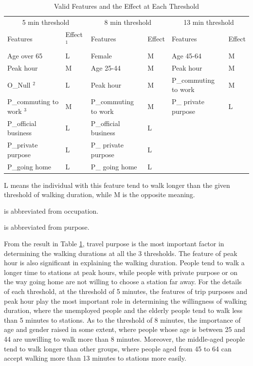 \documentclass[sustainability,article,submit,moreauthors,pdftex,10pt,a4paper]{Definitions/mdpi}
\begin{document}
%
\begin{table}[h]
	\caption{Valid Features and the Effect at Each Threshold}
	\label{table:ValidFeatures}
	\centering
	\begin{tabular}{llllll}
		\toprule
		\multicolumn{2}{c}{5 min threshold} & \multicolumn{2}{c}{8 min threshold} & \multicolumn{2}{c}{13 min threshold} \\
		Features & Effect $^1$ & Features & Effect & Features & Effect \\
		\midrule
		Age over 65 & L	& Female & M & Age 45-64 & M \\
		Peak hour & M & Age 25-44 & M & Peak hour & M \\
		O\_Null	$^2$ & L	& Peak hour	& M	& P\_commuting to work & M \\
		P\_commuting to work $^3$ & M	& P\_commuting to work  & M	& P\_ private purpose & L \\
		P\_official business & L & P\_official business	& L	& & \\
		P\_private purpose & L & P\_ private purpose	& L & & \\
		P\_going home & L & P\_ going home & L & &   \\
		\bottomrule
	\end{tabular}
	\normalsize
	\begin{description}
		\small
		\item[$^1$] L means the individual with this feature tend to walk longer than the given threshold of walking duration, while M is the opposite meaning.
		\item[$^2$] is abbreviated from occupation.
		\item[$^3$] is abbreviated from purpose.
	\end{description}
\end{table}

%
From the result in Table \ref{table:ValidFeatures}, travel purpose is the most important factor in determining the walking durations at all the 3 thresholds. The feature of peak hour is also significant in explaining the walking duration. People tend to walk a longer time to stations at peak hours, while people with private purpose or on the way going home are not willing to choose a station far away. For the details of each threshold, at the threshold of 5 minutes, the features of trip purposes and peak hour play the most important role in determining the willingness of walking duration, where the unemployed people and the elderly people tend to walk less than 5 minutes to stations. As to the threshold of 8 minutes, the importance of age and gender raised in some extent, where people whose age is between 25 and 44 are unwilling to walk more than 8 minutes. Moreover, the middle-aged people tend to walk longer than other groups, where people aged from 45 to 64 can accept walking more than 13 minutes to stations more easily. 
\end{document}
